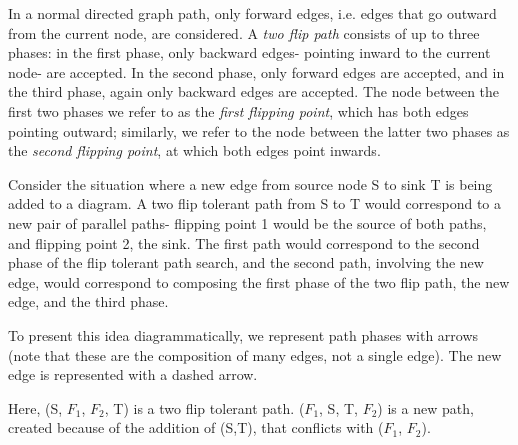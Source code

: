 \documentclass[sigplan,review,anonymous]{acmart}
\begin{document}
In a normal directed graph path, only forward edges, i.e. edges that go outward from the current node, are considered. 
A \textit{two flip path} consists of up to three phases: in the first phase, only backward edges- pointing inward to the current node- are accepted. In the second phase, only forward edges are accepted, and in the third phase, again only backward edges are accepted. The node between the first two phases we refer to as the \textit{first flipping point}, which has both edges pointing outward; similarly, we refer to the node between the latter two phases as the \textit{second flipping point}, at which both edges point inwards.

Consider the situation where a new edge from source node S to sink T is being added to a diagram.
A two flip tolerant path from S to T would correspond to a new pair of parallel paths- flipping point 1 would be the source of both paths, and flipping point 2, the sink. The first path would correspond to the second phase of the flip tolerant path search, and the second path, involving the new edge, would correspond to composing the first phase of the two flip path, the new edge, and the third phase.

To present this idea diagrammatically, we represent path phases with arrows (note that these are the composition of many edges, not a single edge). The new edge is represented with a dashed arrow.

\begin{center}
\end{center}
Here, (S, $F_1$, $F_2$, T) is a two flip tolerant path. ($F_1$, S, T, $F_2$) is a new path, created because of the addition of (S,T), that conflicts with ($F_1$, $F_2$).
\end{document}
